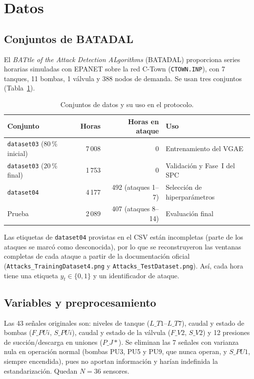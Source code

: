 \documentclass[11pt,a4paper]{article}
\begin{document}
\section{Datos}

\subsection{Conjuntos de BATADAL}

El \emph{BATtle of the Attack Detection ALgorithms} (BATADAL) proporciona series
horarias simuladas con EPANET sobre la red C-Town (\texttt{CTOWN.INP}), con 7
tanques, 11 bombas, 1 válvula y 388 nodos de demanda. Se usan tres conjuntos
(Tabla~\ref{tab:datos}).

\begin{table}[h]
\centering
\caption{Conjuntos de datos y su uso en el protocolo.}
\label{tab:datos}
\begin{tabular}{@{}lrrl@{}}
\toprule
Conjunto & Horas & Horas en ataque & Uso \\
\midrule
\texttt{dataset03} (80\,\% inicial) & 7\,008 & 0 & Entrenamiento del VGAE \\
\texttt{dataset03} (20\,\% final)  & 1\,753 & 0 & Validación y Fase~I del SPC \\
\texttt{dataset04} & 4\,177 & 492 (ataques 1--7) & Selección de hiperparámetros \\
Prueba & 2\,089 & 407 (ataques 8--14) & Evaluación final \\
\bottomrule
\end{tabular}
\end{table}

Las etiquetas de \texttt{dataset04} provistas en el CSV están incompletas (parte de
los ataques se marcó como desconocida), por lo que se reconstruyeron las ventanas
completas de cada ataque a partir de la documentación oficial
(\texttt{Attacks\_TrainingDataset4.png} y \texttt{Attacks\_TestDataset.png}). Así,
cada hora tiene una etiqueta $y_t\in\{0,1\}$ y un identificador de ataque.

\subsection{Variables y preprocesamiento}

Las 43 señales originales son: niveles de tanque ($L\_T1$--$L\_T7$), caudal y estado
de bombas ($F\_PUi$, $S\_PUi$), caudal y estado de la válvula ($F\_V2$, $S\_V2$) y
12 presiones de succión/descarga en uniones ($P\_J\ast$). Se eliminan las 7 señales
con varianza nula en operación normal (bombas PU3, PU5 y PU9, que nunca operan, y
$S\_PU1$, siempre encendida), pues no aportan información y harían indefinida la
estandarización. Quedan $N=36$ sensores.
\end{document}

